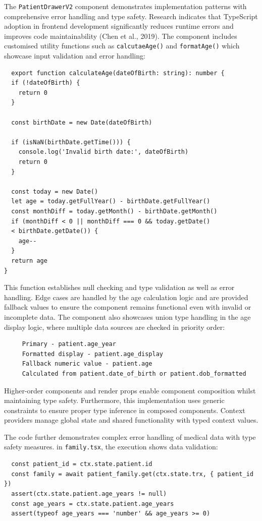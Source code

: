 The \texttt{PatientDrawerV2} component demonstrates implementation patterns with comprehensive error handling and type safety. Research indicates that TypeScript adoption in frontend development significantly reduces runtime errors and improves code maintainability (Chen et al., 2019). The component includes customised utility functions such as \texttt{calcutaeAge()} and \texttt{formatAge()} which showcase input validation and error handling:
\begin{verbatim}
  export function calculateAge(dateOfBirth: string): number {
  if (!dateOfBirth) {
    return 0
  }

  const birthDate = new Date(dateOfBirth)

  if (isNaN(birthDate.getTime())) {
    console.log('Invalid birth date:', dateOfBirth)
    return 0
  }

  const today = new Date()
  let age = today.getFullYear() - birthDate.getFullYear()
  const monthDiff = today.getMonth() - birthDate.getMonth()
  if (monthDiff < 0 || monthDiff === 0 && today.getDate()
  < birthDate.getDate()) {
    age--
  }
  return age
}
\end{verbatim}
This function establishes null checking and type validation as well as error handling. Edge cases are handled by the age calculation logic and are provided fallback values to ensure the component remains functional even with invalid or incomplete data. The component also showcases union type handling in the age display logic, where multiple data sources are checked in priority order:
\begin{verbatim}
     Primary - patient.age_year
     Formatted display - patient.age_display
     Fallback numeric value - patient.age
   	 Calculated from patient.date_of_birth or patient.dob_formatted
\end{verbatim}
Higher-order components and render props enable component composition whilst maintaining type safety. Furthermore, this implementation uses generic constraints to ensure proper type inference in composed components. Context providers manage global state and shared functionality with typed context values.

The code further demonstrates complex error handling of medical data with type safety measures. in \texttt{family.tsx}, the execution shows data validation:
\begin{verbatim}
  const patient_id = ctx.state.patient.id
  const family = await patient_family.get(ctx.state.trx, { patient_id })
  assert(ctx.state.patient.age_years != null)
  const age_years = ctx.state.patient.age_years
  assert(typeof age_years === 'number' && age_years >= 0)
\end{verbatim}

